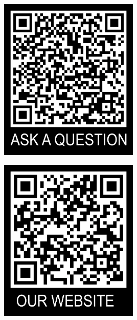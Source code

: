 \documentclass[aspectratio=169,hyperref={unicode}]{beamer}
\begin{document}
\begin{frame}
\begin{center}

\begin{minipage}{0.4\textwidth}
\centering
    \includegraphics[width=0.5\textwidth]{../QRtemplate_5.png}
  \end{minipage}
  \hfill
  \begin{minipage}{0.4\textwidth}
  \centering
    \includegraphics[width=0.5\textwidth]{../QRtemplate_4.png}
  \end{minipage}
\end{center}
\end{frame}
\end{document}
